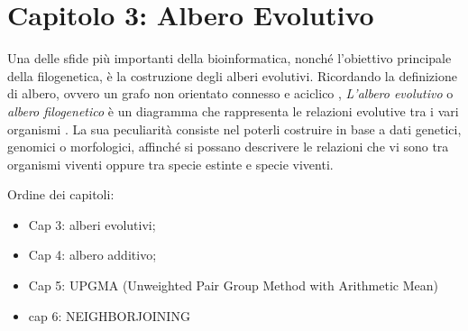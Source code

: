 \chapter{Capitolo 3: Albero Evolutivo}
Una delle sfide più importanti della bioinformatica, nonché l'obiettivo principale della filogenetica, è la costruzione degli alberi evolutivi.
\newline
Ricordando la definizione di albero, ovvero un grafo non orientato connesso e aciclico \cite{algoritmiEStruttureDati2}, \textit{L'albero evolutivo} o \textit{albero filogenetico} è un diagramma che rappresenta le relazioni evolutive tra i vari organismi \cite{buildingaphylogenictree}. La sua peculiarità consiste nel poterli costruire in base a dati genetici, genomici o morfologici, affinché si possano descrivere le relazioni che vi sono tra organismi viventi oppure tra specie estinte e specie viventi.
\newline













\newpage
Ordine dei capitoli:
\begin{itemize}
	\item Cap 3: alberi evolutivi;
	\item Cap 4: albero additivo;
	\item Cap 5: UPGMA (Unweighted Pair Group Method with Arithmetic Mean)
	\item cap 6: NEIGHBORJOINING
\end{itemize}

